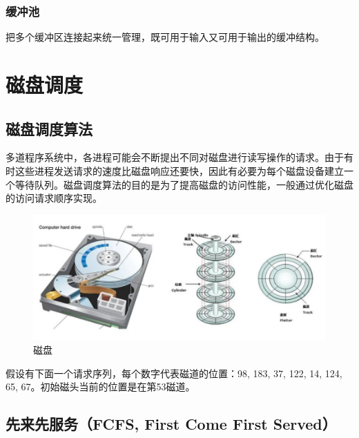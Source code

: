 \subsubsection{缓冲池}

把多个缓冲区连接起来统一管理，既可用于输入又可用于输出的缓冲结构。

\newpage

\section{磁盘调度}

\subsection{磁盘调度算法}

多道程序系统中，各进程可能会不断提出不同对磁盘进行读写操作的请求。由于有时这些进程发送请求的速度比磁盘响应还要快，因此有必要为每个磁盘设备建立一个等待队列。磁盘调度算法的目的是为了提高磁盘的访问性能，一般通过优化磁盘的访问请求顺序实现。

\begin{figure}[H]
    \centering
    \includegraphics[scale=0.9]{img/C4/4-4/1.png}
    \caption{磁盘}
\end{figure}

假设有下面一个请求序列，每个数字代表磁道的位置：98, 183, 37, 122, 14, 124, 65, 67。初始磁头当前的位置是在第53磁道。\\

\subsection{先来先服务（FCFS, First Come First Served）}


